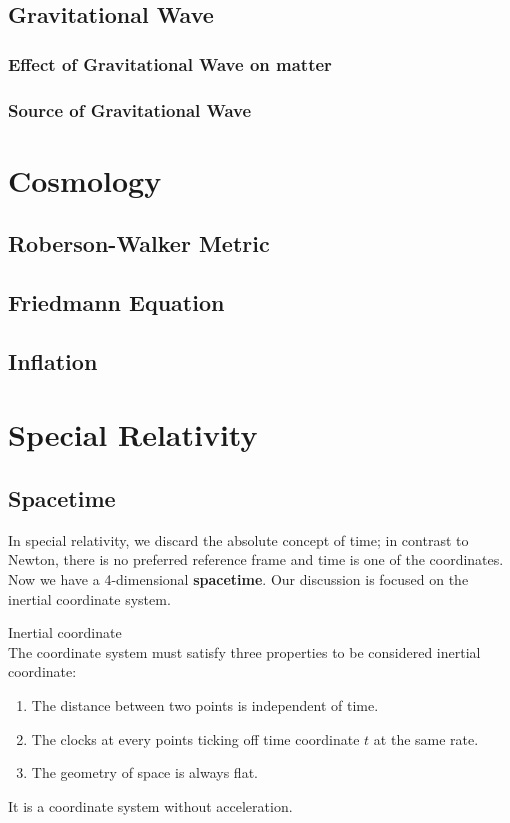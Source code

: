 \documentclass[12pt]{article}
\theoremstyle{mystyle}{\newtheorem{definition}{Definition}[subsection]}
\theoremstyle{mystyle}{\newtheorem{theorem}[definition]{Theorem}}
\theoremstyle{mystyle}{\newtheorem*{remark}{Remark}}
\theoremstyle{mystyle}{\newtheorem{example}{Example}[subsection]}
\theoremstyle{mystyle}{\newtheorem{examples}{Examples}[subsection]}
\theoremstyle{mystyle}{\newtheorem{cthm}{}[subsection]}
\begin{document}
\subsection{Gravitational Wave}
\subsubsection{Effect of Gravitational Wave on matter}
\subsubsection{Source of Gravitational Wave}

\newpage

\section{Cosmology}
\subsection{Roberson-Walker Metric}
\subsection{Friedmann Equation}
\subsection{Inflation}

\newpage
\appendix



\section{Special Relativity}

\subsection{Spacetime}
In special relativity, we discard the absolute concept of time; in contrast to Newton, there is no preferred reference frame
and time is one of the coordinates.
Now we have a 4-dimensional \textbf{spacetime}. Our discussion is focused on the inertial coordinate system.
\begin{definition}
  Inertial coordinate \\
  The coordinate system must satisfy three properties to be considered inertial coordinate:
  \begin{enumerate}
    \item The distance between two points is independent of time.
    \item The clocks at every points ticking off time coordinate $t$ at the same rate.
    \item The geometry of space is always flat.
  \end{enumerate}
  It is a coordinate system without acceleration.
\end{definition}
\end{document}
